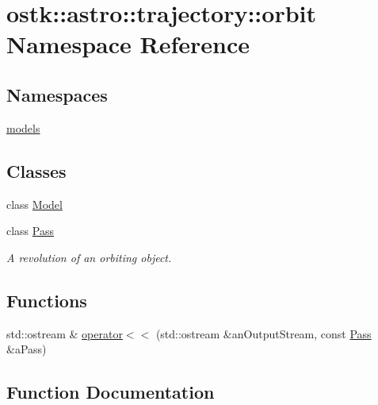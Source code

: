 \hypertarget{namespaceostk_1_1astro_1_1trajectory_1_1orbit}{}\section{ostk\+:\+:astro\+:\+:trajectory\+:\+:orbit Namespace Reference}
\label{namespaceostk_1_1astro_1_1trajectory_1_1orbit}
\subsection*{Namespaces}
\begin{DoxyCompactItemize}
\item 
 \hyperlink{namespaceostk_1_1astro_1_1trajectory_1_1orbit_1_1models}{models}
\end{DoxyCompactItemize}
\subsection*{Classes}
\begin{DoxyCompactItemize}
\item 
class \hyperlink{classostk_1_1astro_1_1trajectory_1_1orbit_1_1_model}{Model}
\item 
class \hyperlink{classostk_1_1astro_1_1trajectory_1_1orbit_1_1_pass}{Pass}
\begin{DoxyCompactList}\small\item\em A revolution of an orbiting object. \end{DoxyCompactList}\end{DoxyCompactItemize}
\subsection*{Functions}
\begin{DoxyCompactItemize}
\item 
std\+::ostream \& \hyperlink{namespaceostk_1_1astro_1_1trajectory_1_1orbit_a09a00f0d051ce7936c28484c812f350d}{operator$<$$<$} (std\+::ostream \&an\+Output\+Stream, const \hyperlink{classostk_1_1astro_1_1trajectory_1_1orbit_1_1_pass}{Pass} \&a\+Pass)
\end{DoxyCompactItemize}


\subsection{Function Documentation}
\mbox{\label{namespaceostk_1_1astro_1_1trajectory_1_1orbit_a09a00f0d051ce7936c28484c812f350d}} 
